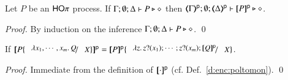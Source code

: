 
\begin{proposition}
Let $P$ be an  $\mathsf{HO}\pi$ process.
If			$\Gamma; \emptyset; \Delta \vdash P \triangleright \diamond$ then 
			$\mapt{\Gamma}^{\mathsf{p}}; \emptyset; \mapt{\Delta}^{\mathsf{p}} \proves \map{P}^{\mathsf{p}} \hastype \Proc$. 
\end{proposition}

\begin{proof}
By induction on the inference $\Gamma; \emptyset; \Delta \vdash P \triangleright \diamond$.
	\qed
\end{proof}

\begin{proposition}\label{p:poltomo}
If $\map{P\subst{\abs{x_1, \cdots, x_m} Q}{X}}^{\mathsf{p}} = \map{P}^{\mathsf{p}}\subst{\abs{z}\binp{z}{x_1} \cdots ; \binp{z}{x_m} \map{Q}^{\mathsf{p}}}{X}$.
\end{proposition}
\begin{proof}
Immediate from the definition of $[\!\![\cdot]\!\!]^{\mathsf{p}}$ (cf. Def.~\ref{d:enc:poltomon}).
	\qed
\end{proof}


